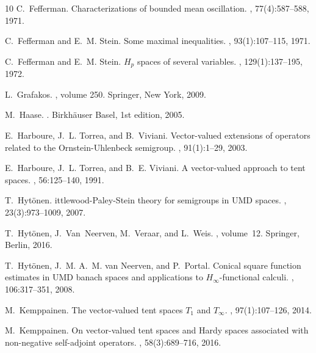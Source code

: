 \documentclass[oneside,english,a4wide]{amsart}
\numberwithin{equation}{section}
\numberwithin{figure}{section}
\theoremstyle{plain}
\theoremstyle{plain}
\theoremstyle{definition}
\theoremstyle{plain}
\theoremstyle{remark}
\theoremstyle{definition}
\theoremstyle{remark}
\theoremstyle{definition}
\newcommand{\8}{+\infty}
\renewcommand{\1}{\mathbbm{1}}
\begin{document}
{\begin{thebibliography}{10}
    C.~Fefferman.
    \newblock Characterizations of bounded mean oscillation.
    , 77(4):587--588, 1971.
    
    C.~Fefferman and E.~M. Stein.
    \newblock Some maximal inequalities.
    , 93(1):107--115, 1971.
    
    C.~Fefferman and E.~M. Stein.
    \newblock ${H}_p$ spaces of several variables.
    , 129(1):137--195, 1972.
    
    L.~Grafakos.
    , volume 250.
    \newblock Springer, New York, 2009.
    
    M.~Haase.
    .
    \newblock Birkh{\"a}user Basel, 1st edition, 2005.
    
    E.~Harboure, J.~L. Torrea, and B.~Viviani.
    \newblock Vector-valued extensions of operators related to the
      {O}rnstein-{U}hlenbeck semigroup.
    , 91(1):1--29, 2003.
    
    E.~Harboure, J.~L. Torrea, and B.~E. Viviani.
    \newblock A vector-valued approach to tent spaces.
    , 56:125--140, 1991.
    
    T.~Hyt{\"o}nen.
    ittlewood-{P}aley-{S}tein theory for semigroups in {UMD} spaces.
    , 23(3):973--1009, 2007.
    
    T.~Hyt{\"o}nen, J.~Van~Neerven, M.~Veraar, and L.~Weis.
    , volume~12.
    \newblock Springer, Berlin, 2016.
    
    T.~Hyt{\"o}nen, J.~M. A.~M. van Neerven, and P.~Portal.
    \newblock Conical square function estimates in {UMD} banach spaces and
      applications to ${H}_\infty$-functional calculi.
    , 106:317--351, 2008.
    
    M.~Kemppainen.
    \newblock The vector-valued tent spaces {$T_1$} and {$T_\infty$}.
    , 97(1):107--126, 2014.
    
    M.~Kemppainen.
    \newblock On vector-valued tent spaces and {H}ardy spaces associated with
      non-negative self-adjoint operators.
    , 58(3):689--716, 2016.
    

\end{thebibliography}}
\end{document}
